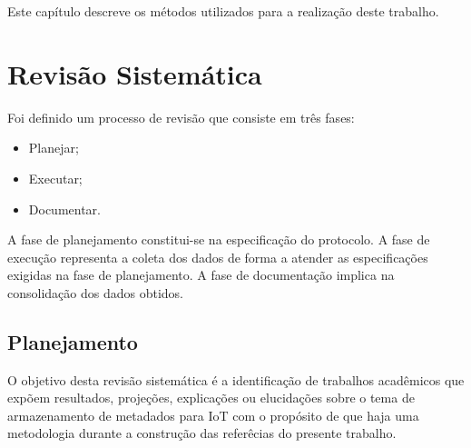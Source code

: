 \newcommand{\texCommand}[1]{\texttt{\textbackslash{#1}}}%

\newcommand{\exemplo}[1]{%
\vspace{\baselineskip}%
\noindent\fbox{\begin{minipage}{\textwidth}#1\end{minipage}}%
\\\vspace{\baselineskip}}%

\newcommand{\exemploVerbatim}[1]{%
\vspace{\baselineskip}%
\noindent\fbox{\begin{minipage}{\textwidth}%
#1\end{minipage}}%
\\\vspace{\baselineskip}}%


\quad Este capítulo descreve os métodos utilizados para a realização deste trabalho.

\section{Revisão Sistemática}

\quad Foi definido um processo de revisão que consiste em três fases:
\begin{itemize}
  \item Planejar;
  \item Executar;
  \item Documentar.
\end{itemize}
\quad A fase de planejamento constitui-se na especificação do protocolo.
A fase de execução representa a coleta dos dados de forma a atender as especificações
exigidas na fase de planejamento.
A fase de documentação implica na consolidação dos dados obtidos.

\subsection{Planejamento}
\quad O objetivo desta revisão sistemática é a identificação de trabalhos acadêmicos
que expõem resultados, projeções, explicações ou elucidações sobre o tema de armazenamento
de metadados para \acrlong{IoT} com o propósito de que haja uma metodologia durante a
construção das referêcias do presente trabalho.

